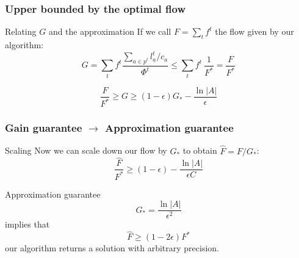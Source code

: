 \documentclass{beamer}
\begin{document}
\begin{frame}
    \frametitle{Upper bounded by the optimal flow}

    
    \begin{block}{Relating $G$ and the approximation}
    If we call $F = \sum_t f^t$ the flow given by our algorithm:
    \begin{equation*}
    G = \sum_t f^t \dfrac{\sum_{a \in p^t} l_a^t / c_a}{\Phi^t}
    \leq
    \sum_t f^t ~ \dfrac{1}{F^*}
    = \dfrac{F}{F^*} \label{approx-bound}
    \end{equation*}
    \end{block}

    \begin{equation*}
    \dfrac{F}{F^*} \geq G \geq (1 - \epsilon) G_* - \frac{\ln|A|}{\epsilon}
    \end{equation*}
\end{frame}

\begin{frame}
    \frametitle{Gain guarantee $\to$ Approximation guarantee}

    \begin{block}{Scaling}
    Now we can scale down our flow by $G_*$ to obtain $\hat{F} = F / G_*$:
    \begin{equation*}
    \dfrac{\hat{F}}{F^*} \geq (1 - \epsilon) - \frac{\ln|A|}{\epsilon C}
    \end{equation*}
    \end{block}
    
    \begin{block}{Approximation guarantee}
    \begin{equation*}
        G_* = \frac{\ln|A|}{\epsilon^2}
    \end{equation*}
    implies that
    \begin{equation*}
    \hat{F} \geq (1 - 2\epsilon) F^*
    \end{equation*}
    our algorithm returns a solution with arbitrary precision.
    \end{block}

\end{frame}
\end{document}
